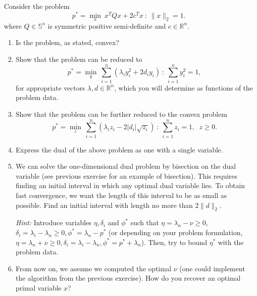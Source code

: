 \documentclass[11pt]{article}
\begin{document}
Consider the problem
\[
p^* = \min_x \: x^T Qx + 2 c^T x ~:~ \|x\|_2 = 1.
\]
where $Q \in \mathbb{S}^{n}$ is symmetric positive semi-definite and $c \in \mathbb{R}^{n}$.
\begin{enumerate}
	\item Is the problem, as stated, convex?
	\item Show that the problem can be reduced to
\[
p^* = \min_y \: \sum_{i=1}^n \left( \lambda_i y_i^2 + 2 d_i y_i \right) ~:~ \sum_{i=1}^n y_i^2 = 1,
\]
for appropriate vectors $\lambda,d \in \mathbb{R}^{n}$, which you will determine as functions of the problem data.
\item Show that the problem can be further reduced to the convex problem
\[
p^* = \min_z \: \sum_{i=1}^n \left( \lambda_i z_i - 2 |d_i| \sqrt{z_i} \right) ~:~ \sum_{i=1}^n z_i = 1, \;\; z \ge 0.
\]
\item Express the dual of the above problem as one with a single variable.
\item We can solve the one-dimensional dual problem by bisection on the dual variable (see previous exercise for an example of bisection). This requires finding an initial interval in which any optimal dual variable lies. To obtain fast convergence, we want the length of this interval to be as small as possible. Find an initial interval with length no more than $2\|d\|_2$.

\emph{Hint:} Introduce variables $\eta, \delta_i$ and $\phi^*$ such that $\eta = \lambda_n - \nu \ge 0$, $\delta_i = \lambda_i - \lambda_n \ge 0, \phi^* = \lambda_n - p^*$ (or depending on your problem formulation, $\eta = \lambda_n + \nu \geq 0, \delta_i = \lambda_i - \lambda_n, \phi^*=p^*+\lambda_n$). Then, try to bound $\eta^*$ with the problem data. 

\item From now on, we assume we computed the optimal $\nu$ (one could implement the algorithm from the previous exercise). How do you recover an optimal primal variable $x$?

\end{enumerate}

\begin{solution}
\end{solution}
\end{document}
